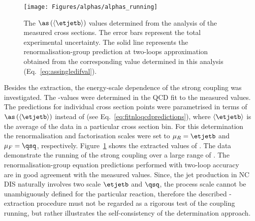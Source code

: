 \begin{figure}[t!]
 \centering
 \texttt{[image: Figures/alphas/alphas\_running]}
 \caption{The $\as\left(\left<\etjetb\right>\right)$ values determined from the analysis of the measured \dsdetjetb cross sections. The error bars represent the total experimental uncertainty. The solid line represents the renormalisation-group prediction at two-loops approximation obtained from the corresponding \asz value determined in this analysis (Eq.~\eqref{eq:assingledifval}).}
 \label{fig:asrunning}
\end{figure}
Besides the \asz extraction, the energy-scale dependence of the strong coupling was investigated. The \as-values were determined in the QCD fit to the measured \dsdetjetb values. The predictions for individual \dsdetjetb cross section points were parametrised in terms of $\as\left(\left<\etjetb\right>\right)$ instead of \asz (see Eq.~\eqref{eq:fitnloqcdpredictions}), where $\left<\etjetb\right>$ is the average \etjetb of the data in a particular cross section bin. For this determination the renormalisation and factorisation scales were set to $\mu_R=\etjetb$ and $\mu_F=\qsq$, respectively. Figure~\ref{fig:asrunning} shows the extracted values of \as. The data demonstrate the running of the strong coupling over a large range of \etjetb. The renormalisation-group equation predictions performed with two-loop accuracy~\cite{Gross:1973id, Politzer:1973fx, Gross:1973ju, Politzer:1974fr} are in good agreement with the measured values. Since, the jet production in NC DIS naturally involves two scale $\etjetb$ and $\qsq$, the process scale cannot be unambiguously defined for the particular reaction, therefore the described \as-extraction procedure must not be regarded as a rigorous test of the coupling running, but rather illustrates the self-consistency of the \as determination approach.



